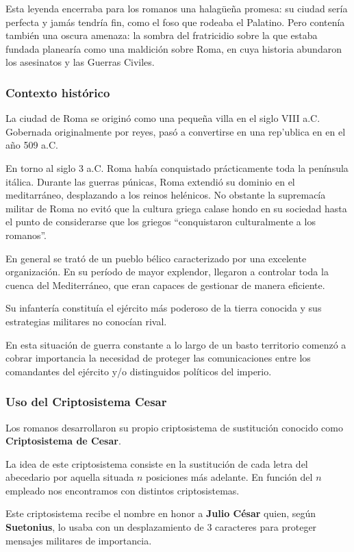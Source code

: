 \documentclass[nochap]{apuntesURJC}
\begin{document}
Esta leyenda encerraba para los romanos una halagüeña promesa: su ciudad sería perfecta y jamás tendría fin, como el foso que rodeaba el Palatino. Pero contenía también una oscura amenaza: la sombra del fratricidio sobre la que estaba fundada planearía como una maldición sobre Roma, en cuya historia abundaron los asesinatos y las Guerras Civiles.

\subsubsection{Contexto histórico}
La ciudad de Roma se originó como una pequeña villa en el siglo VIII a.C. Gobernada originalmente por reyes, pasó a convertirse en una rep'ublica en en el año 509 a.C.

En torno al siglo 3 a.C. Roma había conquistado prácticamente toda la península itálica. Durante las guerras púnicas, Roma extendió su dominio en el meditarráneo, desplazando a los reinos helénicos. No obstante la supremacía militar de Roma no evitó que la cultura griega calase hondo en su sociedad hasta el punto de considerarse que los griegos ``conquistaron culturalmente a los romanos''.

En general se trató de un pueblo bélico caracterizado por una excelente organización. En su período de mayor explendor, llegaron a controlar toda la cuenca del Mediterráneo, que eran capaces de gestionar de manera eficiente.

Su infantería constituía el ejército más poderoso de la tierra conocida y sus estrategias militares no conocían rival.

En esta situación de guerra constante a lo largo de un basto territorio comenzó a cobrar importancia la necesidad de proteger las comunicaciones entre los comandantes del ejército y/o distinguidos políticos del imperio.

\subsubsection{Uso del Criptosistema Cesar}
Los romanos desarrollaron su propio criptosistema de sustitución conocido como \textbf{Criptosistema de Cesar}.

La idea de este criptosistema consiste en la sustitución de cada letra del abecedario por aquella situada $n$ posiciones más adelante. En función del $n$ empleado nos encontramos con distintos criptosistemas.

Este criptosistema recibe el nombre en honor a \textbf{Julio César} quien, según \textbf{Suetonius}, lo usaba con un desplazamiento de 3 caracteres para proteger mensajes militares de importancia.
\end{document}

